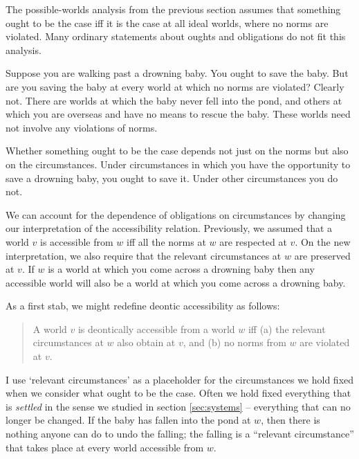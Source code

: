 The possible-worlds analysis from the previous section assumes that something
ought to be the case iff it is the case at all ideal worlds, where no norms are
violated. Many ordinary statements about oughts and obligations do not fit this
analysis.

Suppose you are walking past a drowning baby. You ought to save the baby. But
are you saving the baby at every world at which no norms are violated? Clearly
not. There are worlds at which the baby never fell into the pond, and others at
which you are overseas and have no means to rescue the baby. These worlds need
not involve any violations of norms.

Whether something ought to be the case depends not just on the norms but also on
the circumstances. Under circumstances in which you have the opportunity to
save a drowning baby, you ought to save it. Under other circumstances you do
not.


We can account for the dependence of obligations on circumstances by changing
our interpretation of the accessibility relation. Previously, we assumed that a
world $v$ is accessible from $w$ iff all the norms at $w$ are respected at $v$.
On the new interpretation, we also require that the relevant circumstances at
$w$ are preserved at $v$. If $w$ is a world at which you come across a drowning
baby then any accessible world will also be a world at which you come across a
drowning baby.

As a first stab, we might redefine deontic accessibility as follows:

\begin{quote}
  A world $v$ is deontically accessible from a world $w$ iff (a) the relevant
  circumstances at $w$ also obtain at $v$, and (b) no norms from $w$ are
  violated at $v$.
\end{quote}
%
I use `relevant circumstances' as a placeholder for the circumstances we hold
fixed when we consider what ought to be the case. Often we hold fixed everything
that is \emph{settled} in the sense we studied in section \ref{sec:systems} --
everything that can no longer be changed. If the baby has fallen into the pond
at $w$, then there is nothing anyone can do to undo the falling; the falling is
a ``relevant circumstance'' that takes place at every world accessible from $w$.

